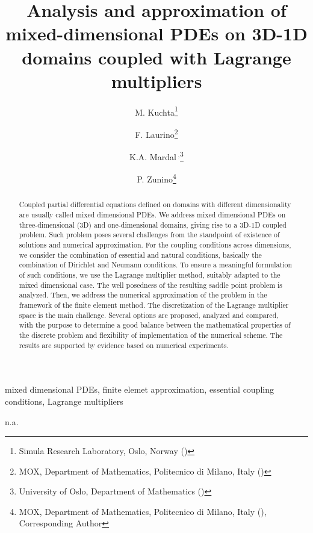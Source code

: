 \documentclass[r]{siamart171218}
\title{Analysis and approximation of mixed-dimensional PDEs on 3D-1D domains coupled with Lagrange multipliers}
\author{M. Kuchta\thanks{Simula Research Laboratory, Oslo, Norway (\email{miroslav@simula.no})}\and F. Laurino\thanks{MOX, Department of Mathematics, Politecnico di Milano, Italy (\email{federica.laurino@polimi.it})} \and K.A. Mardal\footnotemark[1]$^{\;,}$\thanks{University of Oslo, Department of Mathematics (\email{kent-and@math.uio.no})} \and P. Zunino\thanks{MOX, Department of Mathematics, Politecnico di Milano, Italy (\email{paolo.zunino@polimi.it}), Corresponding Author}}
\begin{document}
\linenumbers

\maketitle

\begin{abstract}
Coupled partial differential equations defined on domains with different dimensionality are usually called mixed dimensional PDEs. We address mixed dimensional PDEs on three-dimensional (3D) and one-dimensional domains, giving rise to a 3D-1D coupled problem.
Such problem poses several challenges from the standpoint of existence of solutions and numerical approximation. For the coupling conditions across dimensions, we consider the combination of essential and natural conditions, basically the combination of Dirichlet and Neumann conditions. To ensure a meaningful formulation of such conditions, we use the Lagrange multiplier method, suitably adapted to the mixed dimensional case. The well posedness of the resulting saddle point problem is analyzed. Then, we address the numerical approximation of the problem in the framework of the finite element method. The discretization of the Lagrange multiplier space is the main challenge. Several options are proposed, analyzed and compared, with the purpose to determine a good balance between the mathematical properties of the discrete problem and flexibility of implementation of the numerical scheme. The results are supported by evidence based on numerical experiments.
\end{abstract}

\begin{keywords}
mixed dimensional PDEs, finite elemet approximation, essential coupling conditions, Lagrange multipliers
\end{keywords}

\begin{AMS}
n.a.
\end{AMS}

 
\end{document}
